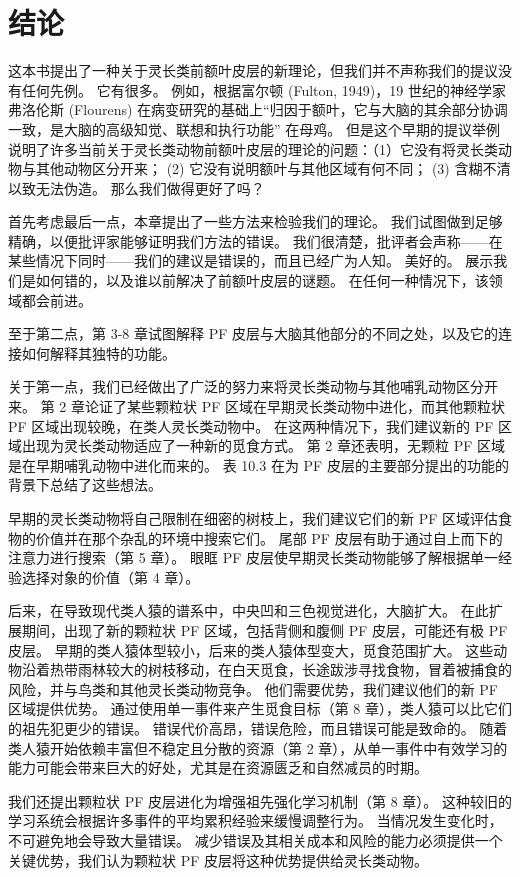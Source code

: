 \section{结论}
这本书提出了一种关于灵长类前额叶皮层的新理论，但我们并不声称我们的提议没有任何先例。 它有很多。 例如，根据富尔顿 (Fulton, 1949)，19 世纪的神经学家弗洛伦斯 (Flourens) 在病变研究的基础上“归因于额叶，它与大脑的其余部分协调一致，是大脑的高级知觉、联想和执行功能” 在母鸡。 但是这个早期的提议举例说明了许多当前关于灵长类动物前额叶皮层的理论的问题：（1）它没有将灵长类动物与其他动物区分开来； (2) 它没有说明额叶与其他区域有何不同； (3) 含糊不清以致无法伪造。 那么我们做得更好了吗？
\par 
首先考虑最后一点，本章提出了一些方法来检验我们的理论。 我们试图做到足够精确，以便批评家能够证明我们方法的错误。 我们很清楚，批评者会声称——在某些情况下同时——我们的建议是错误的，而且已经广为人知。 美好的。 展示我们是如何错的，以及谁以前解决了前额叶皮层的谜题。 在任何一种情况下，该领域都会前进。
\par 
至于第二点，第 3-8 章试图解释 PF 皮层与大脑其他部分的不同之处，以及它的连接如何解释其独特的功能。
\par 
关于第一点，我们已经做出了广泛的努力来将灵长类动物与其他哺乳动物区分开来。 第 2 章论证了某些颗粒状 PF 区域在早期灵长类动物中进化，而其他颗粒状 PF 区域出现较晚，在类人灵长类动物中。 在这两种情况下，我们建议新的 PF 区域出现为灵长类动物适应了一种新的觅食方式。 第 2 章还表明，无颗粒 PF 区域是在早期哺乳动物中进化而来的。 表 10.3 在为 PF 皮层的主要部分提出的功能的背景下总结了这些想法。
\par 
早期的灵长类动物将自己限制在细密的树枝上，我们建议它们的新 PF 区域评估食物的价值并在那个杂乱的环境中搜索它们。 尾部 PF 皮层有助于通过自上而下的注意力进行搜索（第 5 章）。 眼眶 PF 皮层使早期灵长类动物能够了解根据单一经验选择对象的价值（第 4 章）。
\par 
后来，在导致现代类人猿的谱系中，中央凹和三色视觉进化，大脑扩大。 在此扩展期间，出现了新的颗粒状 PF 区域，包括背侧和腹侧 PF 皮层，可能还有极 PF 皮层。 早期的类人猿体型较小，后来的类人猿体型变大，觅食范围扩大。 这些动物沿着热带雨林较大的树枝移动，在白天觅食，长途跋涉寻找食物，冒着被捕食的风险，并与鸟类和其他灵长类动物竞争。 他们需要优势，我们建议他们的新 PF 区域提供优势。 通过使用单一事件来产生觅食目标（第 8 章），类人猿可以比它们的祖先犯更少的错误。 错误代价高昂，错误危险，而且错误可能是致命的。 随着类人猿开始依赖丰富但不稳定且分散的资源（第 2 章），从单一事件中有效学习的能力可能会带来巨大的好处，尤其是在资源匮乏和自然减员的时期。
\par 
我们还提出颗粒状 PF 皮层进化为增强祖先强化学习机制（第 8 章）。 这种较旧的学习系统会根据许多事件的平均累积经验来缓慢调整行为。 当情况发生变化时，不可避免地会导致大量错误。 减少错误及其相关成本和风险的能力必须提供一个关键优势，我们认为颗粒状 PF 皮层将这种优势提供给灵长类动物。
